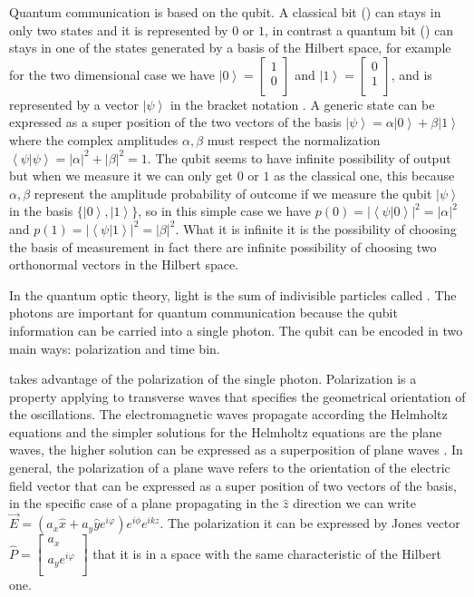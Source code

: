 Quantum communication is based on the qubit. A classical bit () can stays in only two states and it is represented by $0$ or $1$, in contrast a quantum bit () can stays in one of the states generated by  a basis of the Hilbert space, for example for the two dimensional case we have $\left|0\right> = \begin{bmatrix} 1 \\ 0 \\ \end{bmatrix}$ and $\left|1\right> = \begin{bmatrix} 0 \\ 1 \\ \end{bmatrix}$, and is represented by a vector $\left|\psi\right>$ in the bracket notation \cite{a20}. A generic state can be expressed as a super position of the two vectors of the basis $\left|\psi\right> = \alpha\left|0\right> + \beta\left|1\right>$ where the complex amplitudes $\alpha, \beta$ must respect the normalization $\left<\psi|\psi\right> = |\alpha|^2 + |\beta|^2 = 1$. The qubit seems to have infinite possibility of output but when we measure it we can only get $0$ or $1$ as the classical one, this because $\alpha, \beta$ represent the amplitude probability of outcome if we measure the qubit $\left|\psi\right>$ in the basis $\{\left|0\right>, \left|1\right>\}$, so in this simple case we have $p(0) = |\left<\psi|0\right>|^2 = |\alpha|^2$ and $p(1) = |\left<\psi|1\right>|^2 = |\beta|^2$. What it is infinite it is the possibility of choosing the basis of measurement in fact there are infinite possibility of choosing two orthonormal vectors in the Hilbert space.

In the quantum optic theory, light is the sum of indivisible particles called . The photons are important for quantum communication because the qubit information can be carried into a single photon. The qubit can be encoded in two main ways: polarization and time bin.

 takes advantage of the polarization of the single photon. Polarization is a property applying to transverse waves that specifies the geometrical orientation of the oscillations. The electromagnetic waves propagate according the Helmholtz equations and the simpler solutions for the Helmholtz equations are the plane waves, the higher solution can be expressed as a superposition of plane waves \cite{a21}. In general, the polarization of a plane wave refers to the orientation of the electric field vector that can be expressed as a super position of two vectors of the basis, in the specific case of a plane propagating in the $\hat{z}$ direction we can write $\vec{E} = (a_x \hat{x} + a_y \hat{y} e^{i \varphi}) e^{i \phi} e^{i k z}$. The polarization it can be expressed by Jones vector $\hat{P} = \begin{bmatrix} a_x \\ a_y e^{i\varphi} \\ \end{bmatrix}$ that it is in a space with the same characteristic of the Hilbert one.


